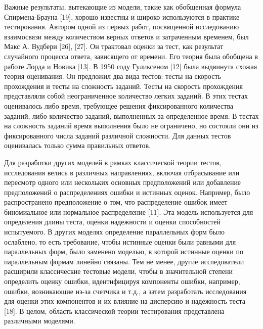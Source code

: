 \documentclass[14pt, a4paper]{extarticle}
\numberwithin{equation}{section}
\begin{document}
{Важные результаты, вытекающие из модели, такие как обобщенная формула Спирмена-Брауна [19], хорошо известны и широко используются в практике тестирования. Автором одной из первых работ, посвященной исследованию взаимосвязи между количеством верных ответов и затраченным временем, был Макс А. Вудбери [26], [27]. Он трактовал оценки за тест, как результат случайного процесса ответа, зависящего от времени. Его теория была обобщена в работе Лорда и Новика [13]. В 1950 году Гуликсеном [12] была выдвинута схожая теория оценивания. Он предложил два вида тестов: тесты на скорость прохождения и тесты на сложность заданий. Тесты на скорость прохождения представляли собой неограниченное количество легких заданий. В этих тестах оценивалось либо время, требующее решения фиксированного количества заданий, либо количество заданий, выполненных за определенное время. В тестах на сложность заданий время выполнения было не ограничено, но состояли они из фиксированного числа заданий различной сложности. Для данных тестов оценивалась только сумма правильных ответов.


Для разработки других моделей в рамках классической теории тестов, исследования велись в различных направлениях, включая отбрасывание или пересмотр одного или нескольких основных предположений или добавление предположений о распределениях ошибки и истинных оценок. Например, было распространено предположение о том, что распределение ошибок имеет биномиальное или нормальное распределение [11]. Эта модель используется для определения длины теста, оценки надежности и оценки способностей испытуемого. В других моделях определение параллельных форм было ослаблено, то есть требование, чтобы истинные оценки были равными для параллельных форм, было заменено моделью, в которой истинные оценки по параллельным формам линейно связаны. Тем не менее, другие исследователи расширили классические тестовые модели, чтобы в значительной степени определить оценку ошибки, идентифицируя компоненты ошибки, например, ошибки, возникающие из-за счетчика и т.д., а затем разработать исследования для оценки этих компонентов и их влияние на дисперсию и надежность теста [18]. В целом, область классической теории тестирования представлена различными моделями.

}
\end{document}

